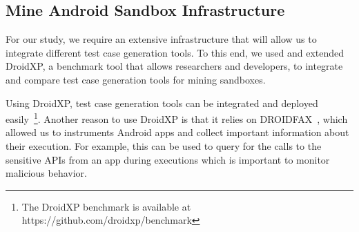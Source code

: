 \subsection{Mine Android Sandbox Infrastructure}

For our study, we require an extensive infrastructure that will allow us to integrate different test case generation tools. To this end, we used and extended DroidXP\cite{DBLP:conf/scam/CostaMCMVBC20}, a benchmark tool that allows researchers and developers, to integrate and compare test case generation tools for mining sandboxes.

Using DroidXP, test case generation tools can be integrated and deployed easily~\footnote{The DroidXP benchmark is available at https://github.com/droidxp/benchmark}. Another reason to use DroidXP is that it relies on DROIDFAX~\cite{cai2016understanding}, which allowed us to instruments Android apps and collect important information about their execution. For example, this can be used to query for the calls to the sensitive APIs from an app during executions which is important to monitor malicious behavior. 

